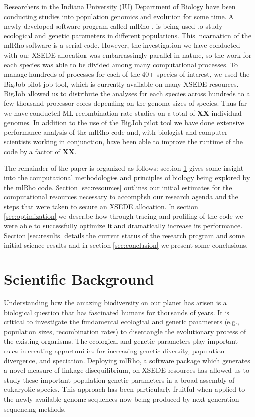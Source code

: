 \documentclass{sig-alternate}
\begin{document}
Researchers in the Indiana University (IU) Department of Biology have been conducting studies into population
genomics and evolution for some time. A newly developed software program called mlRho \cite{MEC:MEC4482}, is
being used to study ecological and genetic parameters in different populations. This incarnation of the
mlRho software is a serial code. However, the investigation we have conducted with our XSEDE allocation was
embarrassingly parallel in nature, so the work for each species was able to be divided among many
computational processes. To manage hundreds of processes for each of the 40+ species of interest, we used the
BigJob pilot-job tool, which is currently available on many XSEDE resources. BigJob allowed us to distribute
the analyses for each species across hundreds to a few thousand processor cores depending on the genome sizes
of species. Thus far we have conducted ML recombination rate studies on a total of {\bf XX} individual
genomes. In addition to the use of the BigJob pilot tool we have done extensive performance analysis of the
mlRho code and, with biologist and computer scientists working in conjunction, have been able to improve the
runtime of the code by a factor of {\bf XX}.

The remainder of the paper is organized as follows: section \ref{sec:background} gives some insight into the
computational methodologies and principles of biology being explored by the mlRho code. Section
\ref{sec:resources} outlines our initial estimates for the computational resources necessary to accomplish our
research agenda and the steps that were taken to secure an XSEDE allocation. In section \ref{sec:optimization}
we describe how through tracing and profiling of the code we were able to successfully optimize it and
dramatically increase its performance. Section \ref{sec:results} details the current status of the research
program and some initial science results and in section \ref{sec:conclusion} we present some conclusions.


\section{Scientific Background}\label{sec:background}
Understanding how the amazing biodiversity on our planet has arisen is a biological question that has
fascinated humans for thousands of years. It is critical to investigate the fundamental ecological and genetic
parameters (e.g., population sizes, recombination rates) to disentangle the evolutionary process of the
existing organisms. The ecological and genetic parameters play important roles in creating opportunities for
increasing genetic diversity, population divergence, and speciation. Deploying mlRho, a software package which
generates a novel measure of linkage disequilibrium, on XSEDE resources has allowed us to study these
important population-genetic parameters in a broad assembly of eukaryotic species. This approach has been
particularly fruitful when applied to the newly available genome sequences now being produced by
next-generation sequencing methods.
\end{document}
